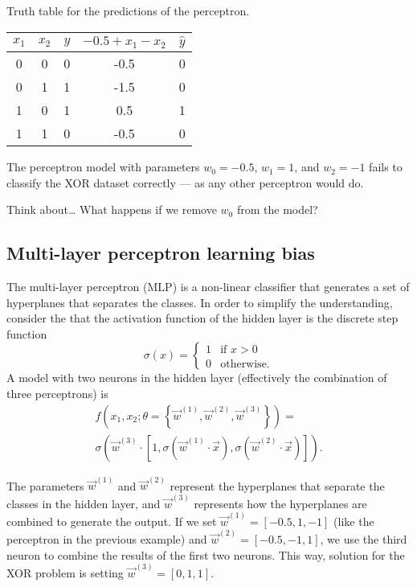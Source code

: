 \begin{tablebox}[label=tab:xor-perceptron]{Truth table for the predictions of the perceptron.}
  \centering
  \begin{tabular}{ccc|cc}
    \toprule
    $x_1$ & $x_2$ & $y$ & $-0.5 + x_1 - x_2$ & $\hat{y}$ \\
    \midrule
    0 & 0 & 0 & -0.5 & 0 \\
    0 & 1 & 1 & -1.5 & 0 \\
    1 & 0 & 1 & 0.5 & 1 \\
    1 & 1 & 0 & -0.5 & 0 \\
    \bottomrule
  \end{tabular}
  \tcblower
  The perceptron model with parameters $w_0 = -0.5$, $w_1 = 1$, and $w_2 = -1$
  fails to classify the XOR dataset correctly --- as any other perceptron would do.
\end{tablebox}

\begin{hlbox}{Think about\dots}
  What happens if we remove $w_0$ from the model?
\end{hlbox}

\subsection{Multi-layer perceptron learning bias}

The multi-layer perceptron (MLP) is a non-linear classifier that generates a set of hyperplanes
that separates the classes.  In order to simplify the understanding, consider the
that the activation function of the hidden layer is the discrete step function
\begin{equation*}
  \sigma(x) = \begin{cases}
    1 & \text{if } x > 0 \\
    0 & \text{otherwise.}
  \end{cases}
\end{equation*}
A model with two neurons in the hidden layer (effectively the combination of three
perceptrons) is
\begin{multline*}
  f(x_1, x_2; \theta = \left\{ \vec{w}^{(1)}, \vec{w}^{(2)}, \vec{w}^{(3)} \right\}) = \\
  \sigma\left(
    \vec{w}^{(3)} \cdot \left[1, \sigma(\vec{w}^{(1)} \cdot \vec{x}), \sigma(\vec{w}^{(2)} \cdot \vec{x})\right]
  \right)\text{.}
\end{multline*}

The parameters $\vec{w}^{(1)}$ and $\vec{w}^{(2)}$ represent the hyperplanes that separate
the classes in the hidden layer, and $\vec{w}^{(3)}$ represents how the hyperplanes are
combined to generate the output.  If we set $\vec{w}^{(1)} = [-0.5, 1, -1]$ (like the
perceptron in the previous example) and $\vec{w}^{(2)} = [-0.5, -1, 1]$, we use the third neuron
to combine the results of the first two neurons.  This way, solution for the XOR problem is
setting $\vec{w}^{(3)} = [0, 1, 1]$.

